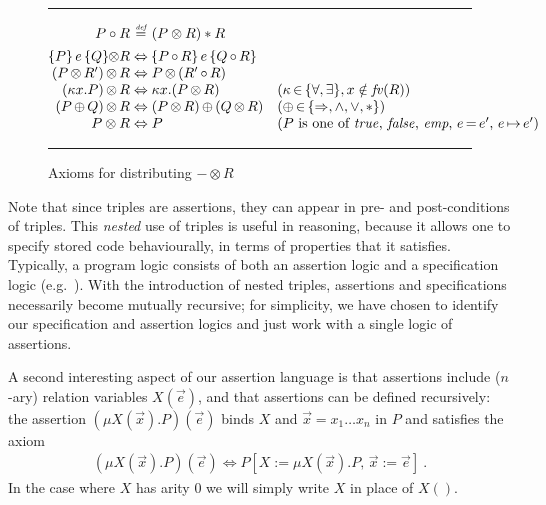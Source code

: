 \documentclass{LMCS}
\theoremstyle{remark}
\newcommand{\fv}[1]{\ensuremath{\mathit{fv}(#1)}}
\newcommand{\defeq}{\ensuremath{\stackrel{\mbox{\tiny \it def}}{=}}}
\newcommand{\triple}[3]{{\ensuremath{\!\left.\{ #1 \}\, #2\, \{  #3 \}\!\right.}}}
\newcommand{\True}{\ensuremath{\mathit{true}}}
\newcommand{\False}{\ensuremath{\mathit{false}}}
\newcommand{\pointsto}{\ensuremath{\mapsto}}
\newcommand{\EMP}{\ensuremath{\textit{emp}}}
\begin{document}
\begin{figure*}[t]
\hrule
$$
\begin{array}{@{}r@{}c@{}l@{\quad}l@{}}
P \circ R &\;\defeq\;& (P\otimes R) * R
\\[1ex]
  \triple{P}{e}{Q} {\otimes} R
&
  \;\Leftrightarrow\;
&
  \triple{P \,{\circ}\, R}{e}{Q \,{\circ}\, R}
\\
  (P\,{\otimes}\,R')\,{\otimes}\, R
&
  \;\Leftrightarrow\;
&
  P\,{\otimes}\,(R'\,{\circ}\, R)
\\
  (\kappa x. P)\,{\otimes}\, R
&
  \;\Leftrightarrow\;
&
  \kappa x. (P \,{\otimes}\, R)
& (\kappa \,{\in}\, \{\forall,\exists\}, x\notin\fv{R})
\\
  (P \,{\oplus}\, Q)\,{\otimes}\, R
&
  \;\Leftrightarrow\;
&
  (P \,{\otimes}\, R) \,{\oplus}\, (Q \,{\otimes}\, R)
&
  (\oplus \,{\in}\, \{\Rightarrow, \wedge, \vee, *\})
\\
  P \otimes R
&
  \;\Leftrightarrow\;
&
  P
&
(\mbox{$P$ is one of $\True$, $\False$, $\EMP$, $e\mathop{=}e'$, $e\mathop{\pointsto} e'$})
\end{array}
$$
\hrule
\caption{Axioms for distributing $-\otimes R$}
\label{fig:DistRules}
\end{figure*}



Note that since triples are assertions, they can appear in pre- and post-conditions of
triples. This \emph{nested} use of triples is useful in reasoning, because it allows one to specify
stored code behaviourally, in terms of properties that it satisfies. 
Typically, 
a program logic consists of both an assertion logic and a specification logic (e.g.\ \cite{Reynolds:82}). 
With the introduction of nested triples, assertions and specifications necessarily become mutually recursive; 
for simplicity, we have chosen to identify our
specification and assertion logics and just work with a single logic of assertions. 



A second interesting aspect of our assertion language is that assertions include ($n$-ary) relation variables $X(\vec e)$, and that assertions can be defined recursively: the assertion $(\mu X(\vec x).P)(\vec e)$ binds $X$ and $\vec x=x_1\ldots x_n$ in $P$ and satisfies the axiom 
\begin{align}
\label{eqn:unfolding-axiom}
(\mu X(\vec x).P)(\vec e) \Leftrightarrow P[X:=\mu X(\vec x).P,\, \vec x:=\vec e]\ .
\end{align}
In the case where $X$ has arity 0 we will simply write $X$ in place of $X()$. 
\end{document}
